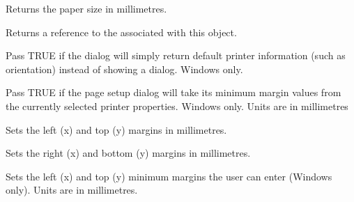 \label{wxpagesetupdialogdatagetpapersize}


Returns the paper size in millimetres.

\label{wxpagesetupdialogdatagetprintdata}


Returns a reference to the  associated with this object.

\label{wxpagesetupdialogdatasetdefaultinfo}


Pass TRUE if the dialog will simply return default printer information (such as orientation)
instead of showing a dialog. Windows only.

\label{wxpagesetupdialogdatasetdefaultminmargins}


Pass TRUE if the page setup dialog will take its minimum margin values from the currently
selected printer properties. Windows only. Units are in millimetres

\label{wxpagesetupdialogdatasetmargintopleft}


Sets the left (x) and top (y) margins in millimetres.

\label{wxpagesetupdialogdatasetmarginbottomright}


Sets the right (x) and bottom (y) margins in millimetres.

\label{wxpagesetupdialogdatasetminmargintopleft}


Sets the left (x) and top (y) minimum margins the user can enter (Windows only). Units are
in millimetres.

\label{wxpagesetupdialogdatasetminmarginbottomright}

